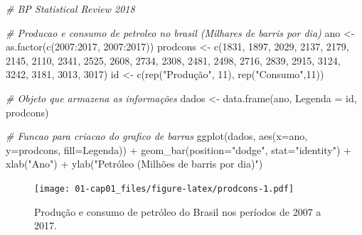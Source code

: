 \documentclass[
]{book}
\newenvironment{Shaded}{\begin{snugshade}}{\end{snugshade}}
\newcommand{\AttributeTok}[1]{\textcolor[rgb]{0.61,0.61,0.61}{#1}}
\newcommand{\CommentTok}[1]{\textcolor[rgb]{0.37,0.37,0.37}{\textit{#1}}}
\newcommand{\DecValTok}[1]{\textcolor[rgb]{0.06,0.06,0.06}{#1}}
\newcommand{\FunctionTok}[1]{\textcolor[rgb]{0,0,0}{#1}}
\newcommand{\NormalTok}[1]{#1}
\newcommand{\OtherTok}[1]{\textcolor[rgb]{0.37,0.37,0.37}{#1}}
\newcommand{\SpecialCharTok}[1]{\textcolor[rgb]{0,0,0}{#1}}
\newcommand{\StringTok}[1]{\textcolor[rgb]{0.5,0.5,0.5}{#1}}
\begin{document}
\begin{Shaded}
\begin{Highlighting}[]
\CommentTok{\# BP Statistical Review 2018}

\CommentTok{\# Producao e consumo de petroleo no brasil (Milhares de barris por dia)}
\NormalTok{ano  }\OtherTok{\textless{}{-}} \FunctionTok{as.factor}\NormalTok{(}\FunctionTok{c}\NormalTok{(}\DecValTok{2007}\SpecialCharTok{:}\DecValTok{2017}\NormalTok{, }\DecValTok{2007}\SpecialCharTok{:}\DecValTok{2017}\NormalTok{))}
\NormalTok{prodcons }\OtherTok{\textless{}{-}} \FunctionTok{c}\NormalTok{(}\DecValTok{1831}\NormalTok{, }\DecValTok{1897}\NormalTok{, }\DecValTok{2029}\NormalTok{, }\DecValTok{2137}\NormalTok{, }\DecValTok{2179}\NormalTok{, }\DecValTok{2145}\NormalTok{, }\DecValTok{2110}\NormalTok{, }\DecValTok{2341}\NormalTok{, }\DecValTok{2525}\NormalTok{, }\DecValTok{2608}\NormalTok{, }\DecValTok{2734}\NormalTok{, }\DecValTok{2308}\NormalTok{, }\DecValTok{2481}\NormalTok{, }\DecValTok{2498}\NormalTok{, }\DecValTok{2716}\NormalTok{, }\DecValTok{2839}\NormalTok{, }\DecValTok{2915}\NormalTok{, }\DecValTok{3124}\NormalTok{, }\DecValTok{3242}\NormalTok{, }\DecValTok{3181}\NormalTok{, }\DecValTok{3013}\NormalTok{, }\DecValTok{3017}\NormalTok{)}
\NormalTok{id }\OtherTok{\textless{}{-}} \FunctionTok{c}\NormalTok{(}\FunctionTok{rep}\NormalTok{(}\StringTok{"Produção"}\NormalTok{, }\DecValTok{11}\NormalTok{), }\FunctionTok{rep}\NormalTok{(}\StringTok{"Consumo"}\NormalTok{,}\DecValTok{11}\NormalTok{))}

\CommentTok{\# Objeto que armazena as informações}
\NormalTok{dados }\OtherTok{\textless{}{-}} \FunctionTok{data.frame}\NormalTok{(ano, }\AttributeTok{Legenda =}\NormalTok{ id, prodcons)}

\CommentTok{\# Funcao para criacao do grafico de barras}
\FunctionTok{ggplot}\NormalTok{(dados, }\FunctionTok{aes}\NormalTok{(}\AttributeTok{x=}\NormalTok{ano, }\AttributeTok{y=}\NormalTok{prodcons, }\AttributeTok{fill=}\NormalTok{Legenda)) }\SpecialCharTok{+}
  \FunctionTok{geom\_bar}\NormalTok{(}\AttributeTok{position=}\StringTok{"dodge"}\NormalTok{, }\AttributeTok{stat=}\StringTok{"identity"}\NormalTok{) }\SpecialCharTok{+}
  \FunctionTok{xlab}\NormalTok{(}\StringTok{"Ano"}\NormalTok{) }\SpecialCharTok{+} \FunctionTok{ylab}\NormalTok{(}\StringTok{"Petróleo (Milhões de barris por dia)"}\NormalTok{)}
\end{Highlighting}
\end{Shaded}

\begin{figure}
\centering
\texttt{[image: 01-cap01\_files/figure-latex/prodcons-1.pdf]}
\caption{\label{fig:prodcons}Produção e consumo de petróleo do Brasil nos períodos de 2007 a 2017.}
\end{figure}
\end{document}
